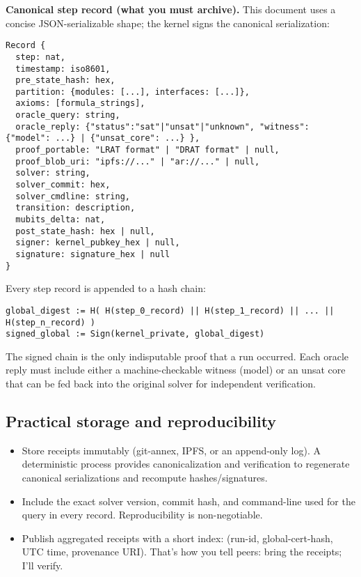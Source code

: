 \documentclass[11pt]{article}
\begin{document}
\textbf{Canonical step record (what you must archive).} This document uses a concise JSON-serializable shape; the kernel signs the canonical serialization:

\begin{verbatim}
Record {
  step: nat,
  timestamp: iso8601,
  pre_state_hash: hex,
  partition: {modules: [...], interfaces: [...]},
  axioms: [formula_strings],
  oracle_query: string,
  oracle_reply: {"status":"sat"|"unsat"|"unknown", "witness": {"model": ...} | {"unsat_core": ...} },
  proof_portable: "LRAT format" | "DRAT format" | null,
  proof_blob_uri: "ipfs://..." | "ar://..." | null,
  solver: string,
  solver_commit: hex,
  solver_cmdline: string,
  transition: description,
  mubits_delta: nat,
  post_state_hash: hex | null,
  signer: kernel_pubkey_hex | null,
  signature: signature_hex | null
}
\end{verbatim}

Every step record is appended to a hash chain:
\begin{verbatim}
global_digest := H( H(step_0_record) || H(step_1_record) || ... || H(step_n_record) )
signed_global := Sign(kernel_private, global_digest)
\end{verbatim}

The signed chain is the only indisputable proof that a run occurred. Each oracle reply must include either a machine-checkable witness (model) or an unsat core that can be fed back into the original solver for independent verification.

\subsection{Practical storage and reproducibility}
\begin{itemize}
  \item Store receipts immutably (git-annex, IPFS, or an append-only log). A deterministic process provides canonicalization and verification to regenerate canonical serializations and recompute hashes/signatures.
  \item Include the exact solver version, commit hash, and command-line used for the query in every record. Reproducibility is non-negotiable.
  \item Publish aggregated receipts with a short index: (run-id, global-cert-hash, UTC time, provenance URI). That’s how you tell peers: bring the receipts; I’ll verify.
\end{itemize}
\end{document}
